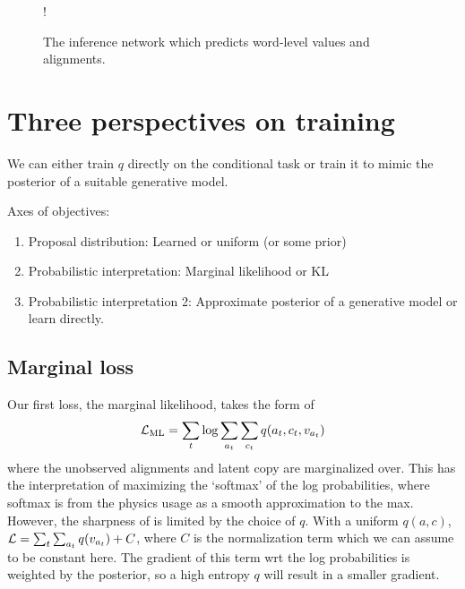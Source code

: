 \documentclass[12pt]{article}
\begin{document}
\begin{figure}[t]
\begin{center}
\resizebox {.3\columnwidth} {!} {
} %
\end{center}
\caption{The inference network which predicts word-level values and alignments.}
\label{fig:infmodel}
\end{figure}

\section{Three perspectives on training}
We can either train $q$ directly on the conditional task
or train it to mimic the posterior of a suitable generative model.

Axes of objectives:
\begin{enumerate}
\item Proposal distribution: Learned or uniform (or some prior)
\item Probabilistic interpretation: Marginal likelihood or KL
\item Probabilistic interpretation 2: Approximate posterior
    of a generative model or learn directly.
\end{enumerate}

\subsection{Marginal loss}
Our first loss, the marginal likelihood, takes the form of
$$\mathcal{L}_{\textrm{ML}} = \sum_t \log \sum_{a_t} \sum_{c_t} q(a_t,c_t,v_{a_t})$$
where the unobserved alignments and latent copy are marginalized over.
This has the interpretation of maximizing the `softmax' of the 
log probabilities, where softmax is from the physics usage
as a smooth approximation to the max.
However, the sharpness of is limited by the choice of $q$.
With a uniform $q(a,c)$, $\mathcal{L} = \sum_t \sum_{a_t}q(v_{a_t}) + C$,
where $C$ is the normalization term which we can assume to be constant here.
The gradient of this term wrt the log probabilities is weighted by the posterior,
so a high entropy $q$ will result in a smaller gradient.
\end{document}

